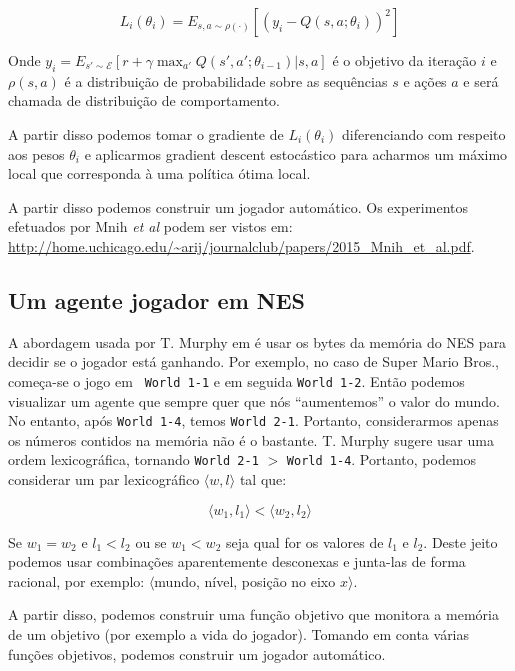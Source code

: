 \documentclass[a4paper,10pt]{article}
\theoremstyle{plain}
\begin{document}
\begin{equation*}
  L_i(\theta_i) = E_{s,a \sim \rho(\cdot)} \left[(y_i - Q(s,a;\theta_i))^2\right]
\end{equation*}

Onde $y_i = E_{s' \sim \mathcal{E}} [r+\gamma\max_{a'}Q(s',a';\theta_{i-1})|s,a]$ é o objetivo da
iteração $i$ e $\rho(s, a)$ é a distribuição de probabilidade sobre as sequências $s$ e ações $a$
e será chamada de distribuição de comportamento.

A partir disso podemos tomar o gradiente de $L_i(\theta_i)$ diferenciando com respeito aos pesos
$\theta_i$ e aplicarmos gradient descent estocástico para acharmos um máximo local que corresponda
à uma política ótima local.

A partir disso podemos construir um jogador automático. Os experimentos efetuados por Mnih \textit{
et al} podem ser vistos em:
\url{http://home.uchicago.edu/~arij/journalclub/papers/2015\_Mnih\_et\_al.pdf}.

\subsection{Um agente jogador em NES}

A abordagem usada por T. Murphy em \cite{dr-murphy} é usar os bytes da memória do NES para decidir
se o jogador está ganhando. Por exemplo, no caso de Super Mario Bros., começa-se o jogo em \texttt{
World 1-1} e em seguida \texttt{World 1-2}. Então podemos visualizar um agente que sempre quer que
nós ``aumentemos'' o valor do mundo. No entanto, após \texttt{World 1-4}, temos \texttt{World
2-1}. Portanto, considerarmos apenas os números contidos na memória não é o bastante. T. Murphy
sugere usar uma ordem lexicográfica, tornando \texttt{World 2-1} $>$ \texttt{World 1-4}. Portanto,
podemos considerar um par lexicográfico $\langle w, l \rangle$ tal que:

\begin{equation*}
  \langle w_1, l_1 \rangle < \langle w_2, l_2 \rangle
\end{equation*}

Se $w_1=w_2$ e $l_1<l_2$ ou se $w_1<w_2$ seja qual for os valores de $l_1$ e $l_2$. Deste jeito
podemos usar combinações aparentemente desconexas e junta-las de forma racional, por exemplo:
$\langle$mundo, nível, posição no eixo $x\rangle$.

A partir disso, podemos construir uma função objetivo que monitora a memória de um objetivo (por
exemplo a vida do jogador). Tomando em conta várias funções objetivos, podemos construir um jogador
automático.
\end{document}
